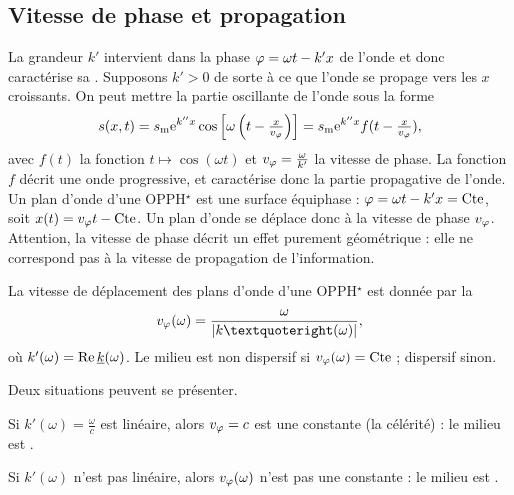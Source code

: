 \documentclass[12pt,fancy]{cours}%
\begin{document}
 \subsection{Vitesse de phase et propagation} La grandeur $k'$ intervient dans la phase $\varphi = \omega t -k' x$ de l'onde et donc caractérise sa .
 Supposons $k'>0$ de sorte à ce que l’onde se propage vers les $x$ croissants. On peut mettre la partie oscillante de l’onde sous la forme
\begin{equation}
\label{eq:OPPH*_vitesse_phase}
s(x,t) 
= s_{\rm{m}}\mathrm{e}^{k'' x}\cos\left[\omega\left(t-\textstyle\frac{x}{v_{\varphi}}\right)\right] = s_{\rm{m}}\mathrm{e}^{k'' x}f(t-\textstyle\frac{x}{v_{\varphi}}),
\end{equation}
avec $f(t)$ la fonction $t \mapsto \cos(\omega t) $ et $v_{\varphi} = \frac{\omega}{k'}$ la vitesse de phase. La fonction $f$ décrit une onde progressive, et caractérise donc la partie propagative de l'onde.
Un plan d'onde d'une OPPH$^{\star}$ est  une surface équiphase : $\varphi = \omega t - k' x = \text{Cte}$, soit $x(t) = v_\varphi t - \text{Cte}$. Un plan d'onde se déplace donc à la vitesse de phase $v_{\varphi}$. Attention, la vitesse de phase décrit un effet purement géométrique :  elle ne correspond pas à la vitesse de propagation de l'information. 
\begin{definition}\label{def:}
 La vitesse de déplacement des plans d'onde d'une OPPH$^{\star}$  est donnée par  la   
    $$
    v_{\vphi}(\omega) = \frac{\omega}{|k’(\omega)|},
    $$
    où  $k'(\omega) = {\rm Re}\, \underline{k}(\omega)$. Le milieu est non dispersif si $v_{\varphi}(\omega) = \text{Cte}$  ; dispersif sinon.
\end{definition}
Deux situations peuvent se présenter.
\begin{liste}
  \item Si $k'(\omega) = \frac{\omega}{c}$ est linéaire, alors $v_{\varphi} = c$ est une constante (la célérité) : le milieu est .
  \item Si $k'(\omega)$ n’est pas linéaire, alors  $v_{\varphi}(\omega)$ n'est pas une constante : le milieu est .
\end{liste}
\end{document}
